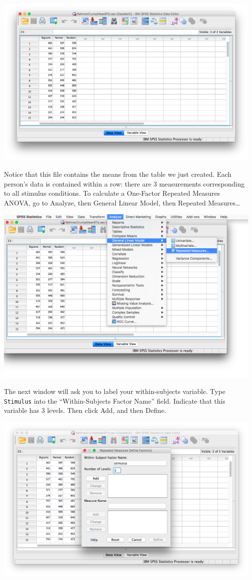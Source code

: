 \documentclass[
]{book}
\begin{document}
\includegraphics{img/9.4.22.png}

Notice that this file contains the means from the table we just created. Each person's data is contained within a row: there are 3 measurements corresponding to all stimulus conditions. To calculate a One-Factor Repeated Measures ANOVA, go to {Analyze}, then {General Linear Model}, then {Repeated Measures\ldots{}}

\includegraphics{img/9.4.23.png}

The next window will ask you to label your within-subjects variable. Type \texttt{Stimulus} into the ``Within-Subjects Factor Name'' field. Indicate that this variable has 3 levels. Then click {Add}, and then {Define}.

\includegraphics{img/9.4.24.png}
\end{document}
